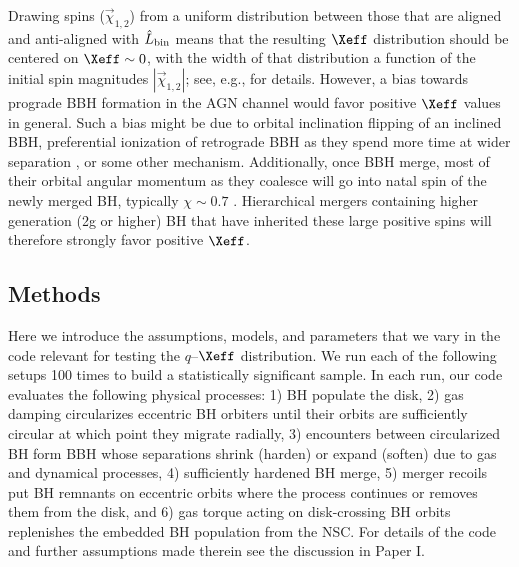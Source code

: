 Drawing spins ($\vec{\chi}_{1,2}$) from a uniform distribution between those that are aligned and anti-aligned with $\hat{L}_{\rm bin}$ means that the resulting $\Xeff$ distribution should be centered on $\Xeff \sim 0$, with the width of that distribution a function of the initial spin magnitudes $|\vec{\chi}_{1,2}|$; see, e.g., \cite{Callister21} for details.
However, a bias towards prograde BBH formation in the AGN channel would favor positive $\Xeff$ values in general.
Such a bias might be due to orbital inclination flipping \citep{DittmannDempseyLi24} of an inclined BBH, preferential ionization of retrograde BBH as they spend more time at wider separation \citep[on average,][]{Wang+21,Calcino+23}, or some other mechanism.
Additionally, once BBH merge, most of their orbital angular momentum as they coalesce will go into natal spin of the newly merged BH, typically $\chi \sim 0.7$ \citep{TichyMarronetti08}.
Hierarchical mergers containing higher generation (2g or higher) BH that have inherited these large positive spins will therefore strongly favor positive $\Xeff$.



\subsection{Methods}
\label{sec:methods-ch2}
Here we introduce the assumptions, models, and parameters that we vary in the  code relevant for testing the $q$--$\Xeff$ distribution.
We run each of the following setups 100 times to build a statistically significant sample.
In each run, our code evaluates the following physical processes: 1) BH populate the disk, 2) gas damping circularizes eccentric BH orbiters until their orbits are sufficiently circular at which point they migrate radially, 3) encounters between circularized BH form BBH whose separations shrink (harden) or expand (soften) due to gas and dynamical processes, 4) sufficiently hardened BH merge, 5) merger recoils put BH remnants on eccentric orbits where the process continues or removes them from the disk, and 6) gas torque acting on disk-crossing BH orbits replenishes the embedded BH population from the NSC.
For details of the code and further assumptions made therein see the discussion in Paper I.

